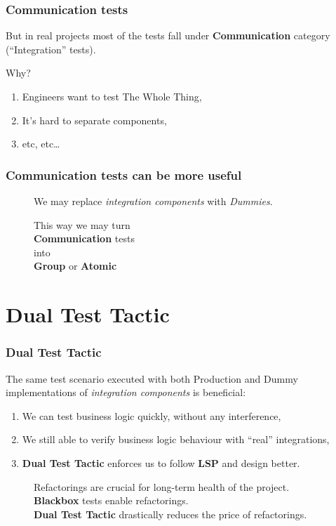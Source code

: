 \documentclass[usenames,dvipsnames,aspectratio=169]{beamer}
\begin{document}
\begin{frame}
  \frametitle{Communication tests}
  But in real projects most of the tests fall under \textbf{Communication} category  (``Integration'' tests).

  \vspace{0.3cm}
  Why?
  \begin{enumerate}
  \item Engineers want to test The Whole Thing,
  \item It's hard to separate components,
  \item etc, etc\dots
  \end{enumerate}
\end{frame}

\begin{frame}
  \frametitle{Communication tests can be more useful}

  \begin{figure}
  We may replace \textit{integration components} with \textit{Dummies}\footnotemark[1].
  \end{figure}

  \begin{figure}
  This way we may turn \\
  \textbf{Communication} tests \\
  into \\
  \textbf{Group} or \textbf{Atomic}\footnotemark[2]
  \end{figure}

\end{frame}


\section{Dual Test Tactic}
\begin{frame}
  \frametitle{Dual Test Tactic}
  The same test scenario executed with both Production and Dummy implementations of \textit{integration components} is beneficial:

  \begin{enumerate}
  \item We can test business logic quickly, without any interference,
  \item We still able to verify business logic behaviour with ``real'' integrations,
  \item \textbf{Dual Test Tactic} enforces us to follow \textbf{LSP} and design better.
  \end{enumerate}

  \begin{figure}
  Refactorings are crucial for long-term health of the project. \\
  \textbf{Blackbox} tests enable refactorings. \\
  \textbf{Dual Test Tactic} drastically reduces the price of refactorings.
  \end{figure}
\end{frame}
\end{document}
